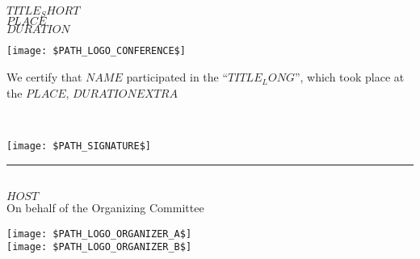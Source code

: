 \documentclass[12pt,landscape]{article}
\begin{document}

\begin{center}
{ \sc \color{marcellanred} $TITLE_SHORT$}\\[5pt]
{ \sc $PLACE$}\\
{ \sc $DURATION$}\\
\end{center}

\begin{center}
\texttt{[image: \$PATH\_LOGO\_CONFERENCE\$]}
\end{center}


\begin{center}
\begin{minipage}{0.7\textwidth}
We certify that $NAME$ participated in the ``$TITLE_LONG$'', which took place at the $PLACE$,
$DURATION$$EXTRA$
\end{minipage}
\end{center}

\begin{center}
\begin{minipage}{0.15\textwidth}
~
\end{minipage}
\begin{minipage}{0.4\textwidth}
\hskip 20pt\texttt{[image: \$PATH\_SIGNATURE\$]}\\
\rule{8cm}{1pt}\\[5pt]
$HOST$\\
On behalf of the Organizing Committee
\end{minipage}
\begin{minipage}{0.4\textwidth}
\texttt{[image: \$PATH\_LOGO\_ORGANIZER\_A\$]}\\
\texttt{[image: \$PATH\_LOGO\_ORGANIZER\_B\$]}
\end{minipage}
\end{center}
\end{document}

